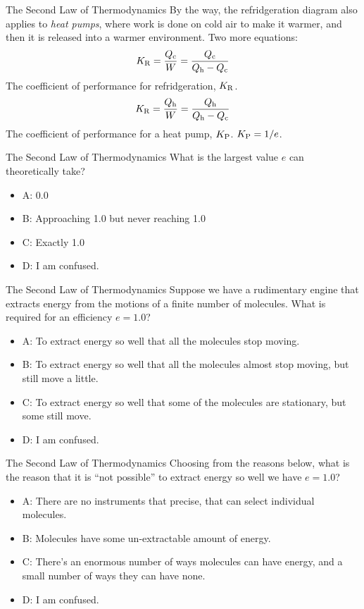 \documentclass{beamer}
\begin{document}
\begin{frame}{The Second Law of Thermodynamics}
By the way, the refridgeration diagram also applies to \textit{heat pumps}, where work is done on cold air to make it warmer, and then it is released into a warmer environment.  Two more equations:
\begin{equation}
K_{\rm R} = \frac{Q_{\rm c}}{W} = \frac{Q_{\rm c}}{Q_{\rm h}-Q_{\rm c}}
\end{equation}
The coefficient of performance for refridgeration, $K_{\rm R}$.
\begin{equation}
K_{\rm R} = \frac{Q_{\rm h}}{W} = \frac{Q_{\rm h}}{Q_{\rm h}-Q_{\rm c}}
\end{equation}
The coefficient of performance for a heat pump, $K_{\rm P}$.  $K_{\rm P} = 1/e$.
\end{frame}

\begin{frame}{The Second Law of Thermodynamics}
What is the largest value $e$ can theoretically take?
\begin{itemize}
\item A: 0.0
\item B: Approaching 1.0 but never reaching 1.0
\item C: Exactly 1.0
\item D: I am confused.
\end{itemize}
\end{frame}

\begin{frame}{The Second Law of Thermodynamics}
Suppose we have a rudimentary engine that extracts energy from the motions of a finite number of molecules.  What is required for an efficiency $e=1.0$?
\begin{itemize}
\item A: To extract energy so well that all the molecules stop moving.
\item B: To extract energy so well that all the molecules almost stop moving, but still move a little.
\item C: To extract energy so well that some of the molecules are stationary, but some still move.
\item D: I am confused.
\end{itemize}
\end{frame}

\begin{frame}{The Second Law of Thermodynamics}
Choosing from the reasons below, what is the reason that it is ``not possible'' to extract energy so well we have $e=1.0$?
\begin{itemize}
\item A: There are no instruments that precise, that can select individual molecules.
\item B: Molecules have some un-extractable amount of energy.
\item C: There's an enormous number of ways molecules can have energy, and a small number of ways they can have none.
\item D: I am confused.
\end{itemize}
\end{frame}
\end{document}
